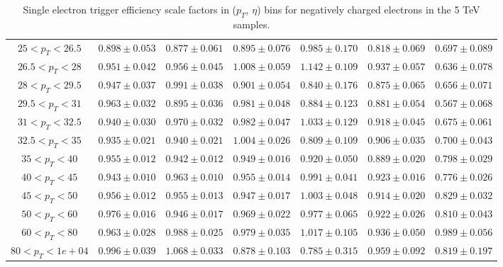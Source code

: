 \begin{table}
\begin{center}
{\begin{tabular}{ccccccc}
\hline \hline
$25<p_{T}<26.5$ & $0.898 \pm 0.053$ & $0.877 \pm 0.061$ & $0.895 \pm 0.076$ & $0.985 \pm 0.170$ & $0.818 \pm 0.069$ & $0.697 \pm 0.089$  \\
$26.5<p_{T}<28$ & $0.951 \pm 0.042$ & $0.956 \pm 0.045$ & $1.008 \pm 0.059$ & $1.142 \pm 0.109$ & $0.937 \pm 0.057$ & $0.636 \pm 0.078$  \\
$28<p_{T}<29.5$ & $0.947 \pm 0.037$ & $0.991 \pm 0.038$ & $0.901 \pm 0.054$ & $0.840 \pm 0.176$ & $0.875 \pm 0.065$ & $0.656 \pm 0.071$  \\
$29.5<p_{T}<31$ & $0.963 \pm 0.032$ & $0.895 \pm 0.036$ & $0.981 \pm 0.048$ & $0.884 \pm 0.123$ & $0.881 \pm 0.054$ & $0.567 \pm 0.068$  \\
$31<p_{T}<32.5$ & $0.940 \pm 0.030$ & $0.970 \pm 0.032$ & $0.982 \pm 0.047$ & $1.033 \pm 0.129$ & $0.918 \pm 0.045$ & $0.675 \pm 0.061$  \\
$32.5<p_{T}<35$ & $0.935 \pm 0.021$ & $0.940 \pm 0.021$ & $1.004 \pm 0.026$ & $0.809 \pm 0.109$ & $0.906 \pm 0.035$ & $0.700 \pm 0.043$  \\
$35<p_{T}<40$ & $0.955 \pm 0.012$ & $0.942 \pm 0.012$ & $0.949 \pm 0.016$ & $0.920 \pm 0.050$ & $0.889 \pm 0.020$ & $0.798 \pm 0.029$  \\
$40<p_{T}<45$ & $0.943 \pm 0.010$ & $0.963 \pm 0.010$ & $0.955 \pm 0.014$ & $0.991 \pm 0.041$ & $0.923 \pm 0.016$ & $0.776 \pm 0.026$  \\
$45<p_{T}<50$ & $0.956 \pm 0.012$ & $0.955 \pm 0.013$ & $0.947 \pm 0.017$ & $1.003 \pm 0.048$ & $0.914 \pm 0.020$ & $0.829 \pm 0.032$  \\
$50<p_{T}<60$ & $0.976 \pm 0.016$ & $0.946 \pm 0.017$ & $0.969 \pm 0.022$ & $0.977 \pm 0.065$ & $0.922 \pm 0.026$ & $0.810 \pm 0.043$  \\
$60<p_{T}<80$ & $0.963 \pm 0.028$ & $0.988 \pm 0.025$ & $0.979 \pm 0.035$ & $1.017 \pm 0.105$ & $0.936 \pm 0.050$ & $0.989 \pm 0.056$  \\
$80<p_{T}<1e+04$ & $0.996 \pm 0.039$ & $1.068 \pm 0.033$ & $0.878 \pm 0.103$ & $0.785 \pm 0.315$ & $0.959 \pm 0.092$ & $0.819 \pm 0.197$  \\
\hline
\end{tabular}}
\end{center}
\caption{Single electron trigger efficiency scale factors in ($p_T$, $\eta$) bins for negatively charged electrons in the 5 TeV samples.}
\label{tab:Eff:el:5TeV:HLT:neg}
\end{table}
